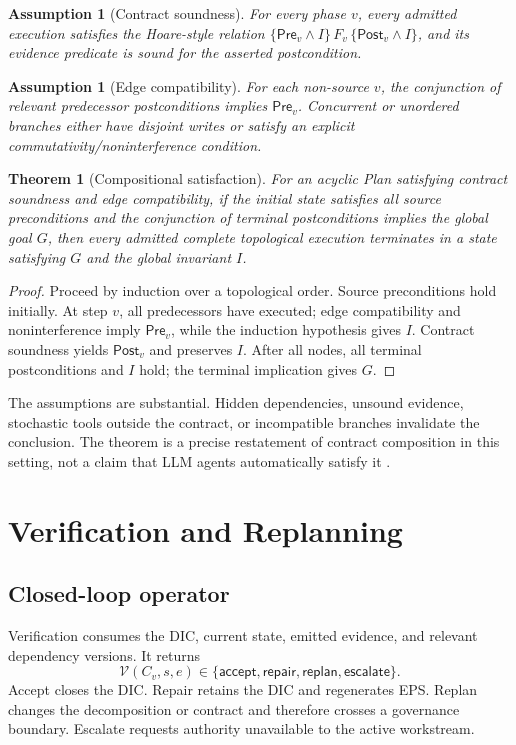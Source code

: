 \documentclass[11pt]{article}
\newtheorem{assumption}[definition]{Assumption}
\newtheorem{theorem}[definition]{Theorem}
\begin{document}
\begin{assumption}[Contract soundness]
For every phase $v$, every admitted execution satisfies the Hoare-style relation
$\{\mathsf{Pre}_v\land I\}\,F_v\,\{\mathsf{Post}_v\land I\}$, and its evidence predicate is sound for the asserted postcondition.
\end{assumption}
\begin{assumption}[Edge compatibility]
For each non-source $v$, the conjunction of relevant predecessor postconditions implies $\mathsf{Pre}_v$. Concurrent or unordered branches either have disjoint writes or satisfy an explicit commutativity/noninterference condition.
\end{assumption}
\begin{theorem}[Compositional satisfaction]
\label{thm:composition}
For an acyclic Plan satisfying contract soundness and edge compatibility, if the initial state satisfies all source preconditions and the conjunction of terminal postconditions implies the global goal $G$, then every admitted complete topological execution terminates in a state satisfying $G$ and the global invariant $I$.
\end{theorem}
\begin{proof}
Proceed by induction over a topological order. Source preconditions hold initially. At step $v$, all predecessors have executed; edge compatibility and noninterference imply $\mathsf{Pre}_v$, while the induction hypothesis gives $I$. Contract soundness yields $\mathsf{Post}_v$ and preserves $I$. After all nodes, all terminal postconditions and $I$ hold; the terminal implication gives $G$.
\end{proof}
The assumptions are substantial. Hidden dependencies, unsound evidence, stochastic tools outside the contract, or incompatible branches invalidate the conclusion. The theorem is a precise restatement of contract composition in this setting, not a claim that LLM agents automatically satisfy it \citep{hoare1969axiomatic}.

\section{Verification and Replanning}
\subsection{Closed-loop operator}
Verification consumes the DIC, current state, emitted evidence, and relevant dependency versions. It returns
\[
\mathcal V(C_v,s,e)\in\{\textsf{accept},\textsf{repair},\textsf{replan},\textsf{escalate}\}.
\]
\textsf{Accept} closes the DIC. \textsf{Repair} retains the DIC and regenerates EPS. \textsf{Replan} changes the decomposition or contract and therefore crosses a governance boundary. \textsf{Escalate} requests authority unavailable to the active workstream.
\end{document}
